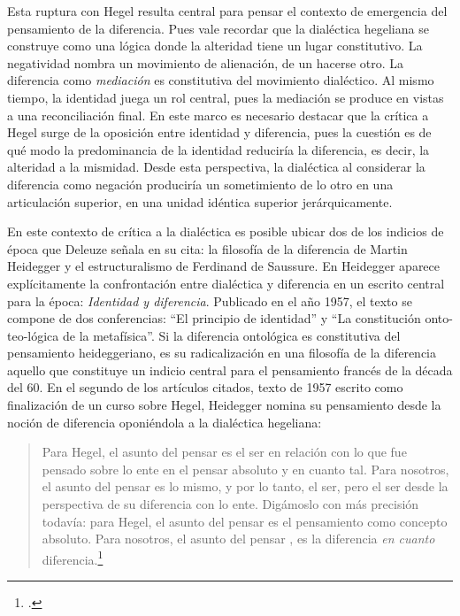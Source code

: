 Esta ruptura con Hegel resulta central para pensar el contexto de emergencia del pensamiento de la diferencia. Pues vale recordar que la dialéctica hegeliana se construye como una lógica donde la alteridad tiene un lugar constitutivo. La negatividad nombra un movimiento de alienación, de un hacerse otro. La diferencia como \emph{mediación} es constitutiva del movimiento dialéctico. Al mismo tiempo, la identidad juega un rol central, pues la mediación se produce en vistas a una reconciliación final. En este marco es necesario destacar que la crítica a Hegel surge de la oposición entre identidad y diferencia, pues la cuestión es de qué modo la predominancia de la identidad reduciría la diferencia, es decir, \linebreak  la alteridad a la mismidad. Desde esta perspectiva, la dialéctica al considerar la diferencia como negación produciría un sometimiento de lo otro en una articulación superior, en una unidad idéntica superior jerárquicamente.


En este contexto de crítica a la dialéctica es posible ubicar dos de los indicios de época que Deleuze señala en su cita: la filosofía de la diferencia de Martin Heidegger y el estructuralismo de Ferdinand de Saussure. En Heidegger aparece explícitamente la confrontación entre dialéctica y diferencia en un escrito central para la época: \emph{Identidad y diferencia}. Publicado en el año 1957, el texto se compone de dos conferencias: \enquote{El principio de identidad} y \enquote{La constitución onto-teo-lógica de la metafísica}. Si la diferencia ontológica es constitutiva del pensamiento heideggeriano, es su radicalización en una filosofía de la diferencia aquello que constituye un indicio central para el pensamiento francés de la década del 60. En el segundo de los artículos citados, texto de 1957 escrito como finalización de un curso sobre Hegel, Heidegger nomina su pensamiento desde la noción de diferencia oponiéndola a la dialéctica hegeliana:

\begin{quote}
Para Hegel, el asunto del pensar es el ser en relación con lo que fue pensado sobre lo ente en el pensar absoluto y en cuanto tal. Para nosotros, el asunto del pensar es lo mismo, y por lo tanto, el ser, pero el ser desde la perspectiva de su diferencia con lo ente. Digámoslo con más precisión todavía: para Hegel, el asunto del pensar es el pensamiento como concepto absoluto. Para nosotros, el asunto del pensar , es la diferencia \emph{en cuanto} diferencia.\footcite[107]{@6966-HEIDEGGER1988}
\end{quote}

